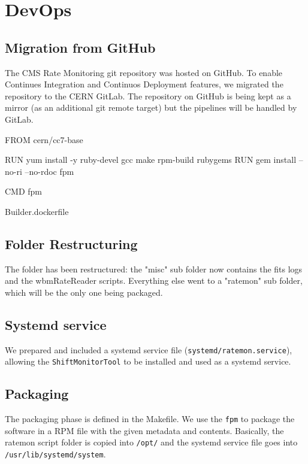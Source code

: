 \section{DevOps}

\subsection{Migration from GitHub}

The CMS Rate Monitoring git repository was hosted on GitHub. To enable Continues Integration and Continuos Deployment features, we migrated the repository to the CERN GitLab. The repository on GitHub is being kept as a mirror (as an additional git remote target) but the pipelines will be handled by GitLab.

\begin{listing}[ht]
\begin{yamlcode}
FROM cern/cc7-base

RUN yum install -y ruby-devel gcc make rpm-build rubygems
RUN gem install --no-ri --no-rdoc fpm

CMD fpm
\end{yamlcode}
\caption{Builder.dockerfile}
\end{listing}

\subsection{Folder Restructuring}

The folder has been restructured: the "misc" sub folder now contains the fits logs and the wbmRateReader scripts. Everything else went to a "ratemon" sub folder, which will be the only one being packaged.

\subsection{Systemd service}

We prepared and included a systemd service file (\texttt{systemd/ratemon.service}), allowing the \texttt{ShiftMonitorTool} to be installed and used as a systemd service.

\subsection{Packaging}

The packaging phase is defined in the Makefile. We use the \texttt{fpm} to package the software in a RPM file with the given metadata and contents. Basically, the ratemon script folder is copied into \texttt{/opt/} \cite{FilesystemHierarchyStandard-2015-05-20} and the systemd service file goes into \texttt{/usr/lib/systemd/system}.

